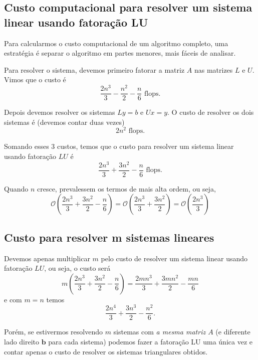 \subsection{Custo computacional para resolver um sistema linear usando fatoração LU}
Para calcularmos o custo computacional de um algoritmo completo, uma estratégia é separar o algoritmo em partes menores, mais fáceis de analisar.

Para resolver o sistema, devemos primeiro fatorar a matriz $A$ nas matrizes $L$ e $U$. Vimos que o custo é
\begin{equation} \frac{2n^3}{3}-\frac{n^2}{2}-\frac{n}{6} \text{~flops}. \end{equation}

Depois devemos resolver os sistemas $Ly=b$ e $Ux=y$. O custo de resolver os dois sistemas é (devemos contar duas vezes)
\begin{equation}  2 n^2\text{~flops}. \end{equation}

Somando esses $3$ custos, temos que o custo para resolver um sistema linear usando fatoração $LU$ é
\begin{equation} \frac{2n^3}{3}+\frac{3n^2}{2}-\frac{n}{6} \text{~flops}. \end{equation}

Quando $n$ cresce, prevalessem os termos de mais alta ordem, ou seja,
\begin{equation} \mathcal{O}(\frac{2n^3}{3}+\frac{3n^2}{2}-\frac{n}{6}) = \mathcal{O}(\frac{2n^3}{3}+\frac{3n^2}{2})=\mathcal{O}(\frac{2n^3}{3}) \end{equation}

\subsection{Custo para resolver m sistemas lineares}
Devemos apenas multiplicar $m$ pelo custo de resolver um sistema linear usando fatoração $LU$, ou seja, o custo será
\begin{equation} m(\frac{2n^3}{3}+\frac{3n^2}{2}-\frac{n}{6})=\frac{2mn^3}{3}+\frac{3mn^2}{2}-\frac{mn}{6} \end{equation}
e com $m=n$ temos
\begin{equation} \frac{2n^4}{3}+\frac{3n^3}{2}-\frac{n^2}{6}. \end{equation}

Porém, se estivermos resolvendo $m$ sistemas com \textit{a mesma matriz $A$ }(e diferente lado direito $\pmb b$ para cada sistema) podemos fazer a fatoração LU uma única vez e contar apenas o custo de resolver os sistemas triangulares obtidos.


